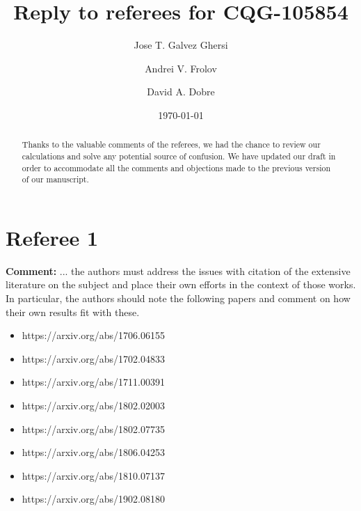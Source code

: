 \documentclass[preprintnumbers,floats,floatfix,amssymb,prd,onecolumn,superscriptaddress,nofootinbib]{revtex4}
\begin{document}
\title{Reply to referees for CQG-105854}

\author{Jose T. Galvez Ghersi}%

\author{Andrei V. Frolov}

\author{David A. Dobre}
\date{\today}

\begin{abstract} 
Thanks to the valuable comments of the referees, we had the chance to review our calculations and solve any potential source of confusion. We have updated our draft in order to accommodate all the comments and objections made to the previous version of our manuscript. 
\end{abstract}
\maketitle

\section{Referee 1}
  
\textbf{Comment:} ... the authors must address the issues with citation of the extensive literature on the subject and place their own efforts in the context of those works. In particular, the authors should note the following papers and comment on how their own results fit with these.\\  
\begin{itemize}
\item{https://arxiv.org/abs/1706.06155}\\
\item{https://arxiv.org/abs/1702.04833}\\
\item{https://arxiv.org/abs/1711.00391}\\
\item{https://arxiv.org/abs/1802.02003}\\
\item{https://arxiv.org/abs/1802.07735}\\
\item{https://arxiv.org/abs/1806.04253}\\
\item{https://arxiv.org/abs/1810.07137}\\
\item{https://arxiv.org/abs/1902.08180}\\
\end{itemize}
\end{document}
